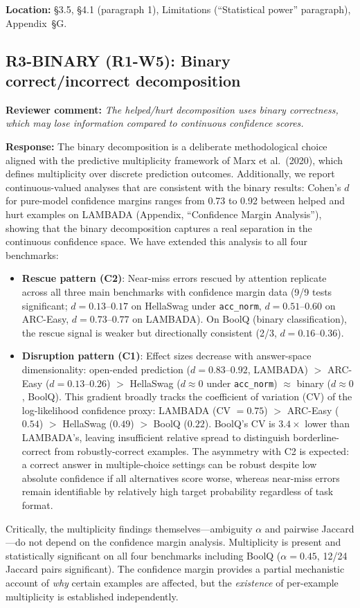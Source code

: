 \documentclass[11pt]{article}
\newcommand{\reviewer}[1]{\textcolor{reviewercolor}{\textbf{Reviewer comment:} \textit{#1}}}
\newcommand{\response}[1]{\textcolor{responsecolor}{\textbf{Response:} #1}}
\newcommand{\location}[1]{\textbf{Location:} #1}
\begin{document}
\location{\S3.5, \S4.1 (paragraph 1), Limitations (``Statistical power'' paragraph), Appendix~\S G.}

\subsection*{R3-BINARY (R1-W5): Binary correct/incorrect decomposition}

\reviewer{The helped/hurt decomposition uses binary correctness, which may lose information compared to continuous confidence scores.}

\response{The binary decomposition is a deliberate methodological choice aligned with the predictive multiplicity framework of Marx et al.\ (2020), which defines multiplicity over discrete prediction outcomes. Additionally, we report continuous-valued analyses that are consistent with the binary results: Cohen's $d$ for pure-model confidence margins ranges from 0.73 to 0.92 between helped and hurt examples on LAMBADA (Appendix, ``Confidence Margin Analysis''), showing that the binary decomposition captures a real separation in the continuous confidence space. We have extended this analysis to all four benchmarks:}
\begin{itemize}[leftmargin=2em]
\item \textbf{Rescue pattern (C2)}: Near-miss errors rescued by attention replicate across all three main benchmarks with confidence margin data (9/9 tests significant; $d = 0.13$--$0.17$ on HellaSwag under \texttt{acc\_norm}, $d = 0.51$--$0.60$ on ARC-Easy, $d = 0.73$--$0.77$ on LAMBADA). On BoolQ (binary classification), the rescue signal is weaker but directionally consistent (2/3, $d = 0.16$--$0.36$).
\item \textbf{Disruption pattern (C1)}: Effect sizes decrease with answer-space dimensionality: open-ended prediction ($d = 0.83$--$0.92$, LAMBADA) $>$ ARC-Easy ($d = 0.13$--$0.26$) $>$ HellaSwag ($d \approx 0$ under \texttt{acc\_norm}) $\approx$ binary ($d \approx 0$, BoolQ). This gradient broadly tracks the coefficient of variation (CV) of the log-likelihood confidence proxy: LAMBADA (CV $= 0.75$) $>$ ARC-Easy ($0.54$) $>$ HellaSwag ($0.49$) $>$ BoolQ ($0.22$). BoolQ's CV is $3.4\times$ lower than LAMBADA's, leaving insufficient relative spread to distinguish borderline-correct from robustly-correct examples. The asymmetry with C2 is expected: a correct answer in multiple-choice settings can be robust despite low absolute confidence if all alternatives score worse, whereas near-miss errors remain identifiable by relatively high target probability regardless of task format.
\end{itemize}
Critically, the multiplicity findings themselves---ambiguity $\alpha$ and pairwise Jaccard---do not depend on the confidence margin analysis. Multiplicity is present and statistically significant on all four benchmarks including BoolQ ($\alpha = 0.45$, 12/24 Jaccard pairs significant). The confidence margin provides a partial mechanistic account of \emph{why} certain examples are affected, but the \emph{existence} of per-example multiplicity is established independently.
\end{document}
